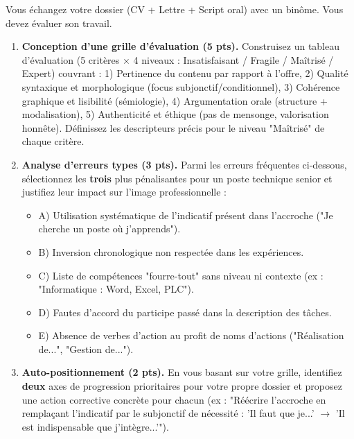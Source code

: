 \documentclass[11pt]{article}
\begin{document}
\begin{exercice}
Vous échangez votre dossier (CV + Lettre + Script oral) avec un binôme. Vous devez évaluer son travail.

\begin{enumerate}
    \item \textbf{Conception d'une grille d'évaluation (5 pts).} Construisez un tableau d'évaluation (5 critères $\times$ 4 niveaux : Insatisfaisant / Fragile / Maîtrisé / Expert) couvrant : 1) Pertinence du contenu par rapport à l'offre, 2) Qualité syntaxique et morphologique (focus subjonctif/conditionnel), 3) Cohérence graphique et lisibilité (sémiologie), 4) Argumentation orale (structure + modalisation), 5) Authenticité et éthique (pas de mensonge, valorisation honnête). Définissez les descripteurs précis pour le niveau "Maîtrisé" de chaque critère.
    \item \textbf{Analyse d'erreurs types (3 pts).} Parmi les erreurs fréquentes ci-dessous, sélectionnez les \textbf{trois} plus pénalisantes pour un poste technique senior et justifiez leur impact sur l'image professionnelle :
    \begin{itemize}
        \item A) Utilisation systématique de l'indicatif présent dans l'accroche ("Je cherche un poste où j'apprends").
        \item B) Inversion chronologique non respectée dans les expériences.
        \item C) Liste de compétences "fourre-tout" sans niveau ni contexte (ex : "Informatique : Word, Excel, PLC").
        \item D) Fautes d'accord du participe passé dans la description des tâches.
        \item E) Absence de verbes d'action au profit de noms d'actions ("Réalisation de...", "Gestion de...").
    \end{itemize}
    \item \textbf{Auto-positionnement (2 pts).} En vous basant sur votre grille, identifiez \textbf{deux} axes de progression prioritaires pour votre propre dossier et proposez une action corrective concrète pour chacun (ex : "Réécrire l'accroche en remplaçant l'indicatif par le subjonctif de nécessité : 'Il faut que je...' $\rightarrow$ 'Il est indispensable que j'intègre...'").
\end{enumerate}
\end{exercice}
\end{document}
